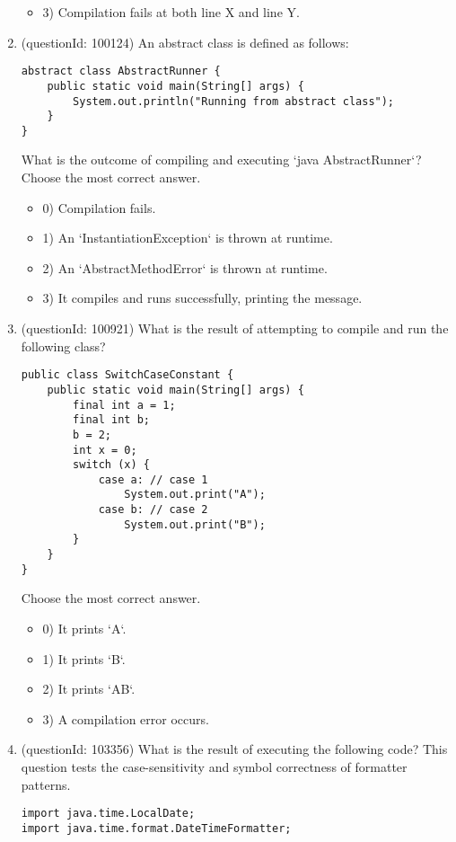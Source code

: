 \documentclass[12pt]{article}
\begin{document}
\begin{enumerate}[label=(\arabic*)]
\begin{itemize}
\item 3) Compilation fails at both line X and line Y.

\end{itemize}
\item (questionId: 100124) An abstract class is defined as follows:
\begin{verbatim}
abstract class AbstractRunner {
    public static void main(String[] args) {
        System.out.println("Running from abstract class");
    }
}
\end{verbatim}
What is the outcome of compiling and executing `java AbstractRunner`?
Choose the most correct answer. 
\begin{itemize}
\item 0) Compilation fails.

\item 1) An `InstantiationException` is thrown at runtime.

\item 2) An `AbstractMethodError` is thrown at runtime.

\item 3) It compiles and runs successfully, printing the message.

\end{itemize}
\item (questionId: 100921) What is the result of attempting to compile and run the following class?\n\begin{verbatim}
public class SwitchCaseConstant {
    public static void main(String[] args) {
        final int a = 1;
        final int b;
        b = 2;
        int x = 0;
        switch (x) {
            case a: // case 1
                System.out.print("A");
            case b: // case 2
                System.out.print("B");
        }
    }
}
\end{verbatim}
Choose the most correct answer. 
\begin{itemize}
\item 0) It prints `A`.

\item 1) It prints `B`.

\item 2) It prints `AB`.

\item 3) A compilation error occurs.

\end{itemize}
\item (questionId: 103356) What is the result of executing the following code? This question tests the case-sensitivity and symbol correctness of formatter patterns.
\begin{verbatim}
import java.time.LocalDate;
import java.time.format.DateTimeFormatter;


\end{verbatim}
\end{enumerate}
\end{document}
